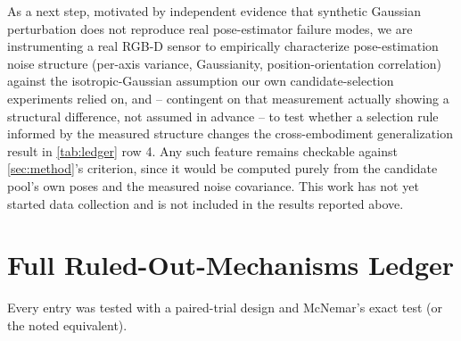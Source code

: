 \documentclass[journal]{IEEEtran}
\begin{document}
As a next step, motivated by independent evidence \cite{consensusuncertainty2025}
that synthetic Gaussian perturbation does not reproduce real
pose-estimator failure modes, we are instrumenting a real RGB-D sensor to
empirically characterize pose-estimation noise structure (per-axis
variance, Gaussianity, position-orientation correlation) against the
isotropic-Gaussian assumption our own candidate-selection experiments
relied on, and -- contingent on that measurement actually showing a
structural difference, not assumed in advance -- to test whether a
selection rule informed by the measured structure changes the
cross-embodiment generalization result in \cref{tab:ledger} row 4. Any
such feature remains checkable against \cref{sec:method}'s criterion,
since it would be computed purely from the candidate pool's own poses and
the measured noise covariance. This work has not yet started data
collection and is not included in the results reported above.

\appendix
\section{Full Ruled-Out-Mechanisms Ledger}
\label{app:ledger}

Every entry was tested with a paired-trial design and McNemar's exact
test (or the noted equivalent).
\end{document}
